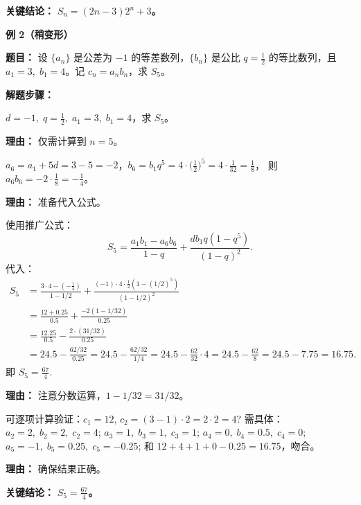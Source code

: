 \begin{examplebox}
\textbf{\textcolor{CExample}{关键结论：}} \textbf{\(S_n = (2n-3)2^n + 3\)。}

\medskip
\textbf{\textcolor{CExample}{例 2（稍变形）}}

\textbf{\textcolor{CExample}{题目：}} 设 \(\{a_n\}\) 是公差为 \(-1\) 的等差数列，\(\{b_n\}\) 是公比 \(q = \frac{1}{2}\) 的等比数列，且 \(a_1=3,\; b_1=4\)。记 \(c_n = a_n b_n\)，求 \(S_5\)。

\textbf{\textcolor{CExample}{解题步骤：}}
\begin{description}[style=nextline, leftmargin=2.8em, labelsep=0.5em, itemsep=0.45em]
    \item[\textbf{第一步（参数提取）：}] \(d = -1,\; q = \frac{1}{2},\; a_1=3,\; b_1=4\)，求 \(S_5\)。
    \par\textbf{理由：} 仅需计算到 \(n=5\)。

    \item[\textbf{第二步（计算相关项）：}]
    \(a_6 = a_1 + 5d = 3 -5 = -2\)，\(b_6 = b_1 q^{5} = 4 \cdot \bigl(\frac{1}{2}\bigr)^{5} = 4 \cdot \frac{1}{32} = \frac{1}{8}\)，
    则 \(a_6 b_6 = -2 \cdot \frac{1}{8} = -\frac{1}{4}\)。
    \par\textbf{理由：} 准备代入公式。

    \item[\textbf{第三步（代入公式求值）：}] 使用推广公式：
    \[
    S_5 = \frac{a_1 b_1 - a_6 b_6}{1-q} + \frac{d b_1 q (1 - q^5)}{(1-q)^2}.
    \]
    代入：
    \[
    \begin{aligned}
    S_5 &= \frac{3\cdot 4 - (-\frac{1}{4})}{1 - 1/2} + \frac{(-1)\cdot 4 \cdot \frac{1}{2} (1 - (1/2)^5)}{(1 - 1/2)^2}\\
        &= \frac{12 + 0.25}{0.5} + \frac{-2 (1 - 1/32)}{0.25}\\
        &= \frac{12.25}{0.5} - \frac{2 \cdot (31/32)}{0.25}\\
        &= 24.5 - \frac{62/32}{0.25} = 24.5 - \frac{62/32}{1/4} = 24.5 - \frac{62}{32}\cdot 4 = 24.5 - \frac{62}{8} = 24.5 - 7.75 = 16.75.
    \end{aligned}
    \]
    即 \(S_5 = \frac{67}{4}\).
    \par\textbf{理由：} 注意分数运算，\(1 - 1/32 = 31/32\)。

    \item[\textbf{第四步（检验）：}] 可逐项计算验证：\(c_1=12\), \(c_2= (3-1)\cdot 2 = 2\cdot 2 =4\)? 需具体：\(a_2=2,\; b_2=2,\; c_2=4\); \(a_3=1,\; b_3=1,\; c_3=1\); \(a_4=0,\; b_4=0.5,\; c_4=0\); \(a_5=-1,\; b_5=0.25,\; c_5=-0.25\); 和 \(12+4+1+0-0.25=16.75\)，吻合。
    \par\textbf{理由：} 确保结果正确。
\end{description}

\textbf{\textcolor{CExample}{关键结论：}} \textbf{\(S_5 = \frac{67}{4}\)。}
\end{examplebox}
